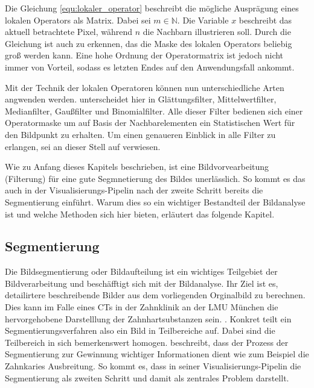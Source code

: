 Die Gleichung \ref{equ:lokaler_operator} beschreibt die mögliche Ausprägung eines
lokalen Operators als Matrix. Dabei sei $m \in \mathbb{N}$. Die Variable $x$ beschreibt
das aktuell betrachtete Pixel, während $n$ die Nachbarn illustrieren soll. Durch
die Gleichung ist auch zu erkennen, das die Maske des lokalen Operators beliebig
groß werden kann. Eine hohe Ordnung der Operatormatrix ist jedoch nicht immer von
Vorteil, sodass es letzten Endes auf den Anwendungsfall ankommt.

Mit der Technik der lokalen Operatoren können nun unterschiedliche Arten
angwenden werden. \citet[Seite 54 - 55]{handels2000} unterscheidet hier in Glättungsfilter,
Mittelwertfilter, Medianfilter, Gaußfilter und Binomialfilter. Alle dieser Filter
bedienen sich einer Operatormaske um auf Basis der Nachbarelementen ein Statistischen
Wert für den Bildpunkt zu erhalten. Um einen genaueren Einblick in alle Filter
zu erlangen, sei an dieser Stell auf \citet[Seite 54 - 55]{handels2000} verwiesen.

Wie zu Anfang dieses Kapitels beschrieben, ist eine Bildvorvearbeitung (Filterung)
für eine gute Segmnetierung des Bildes unerlässlich. So kommt es das auch in der
Visualisierungs-Pipelin nach \citet[Seite 50]{handels2000} der zweite Schritt bereits
die Segmentierung einführt. Warum dies so ein wichtiger Bestandteil der
Bildanalyse ist und welche Methoden sich hier bieten, erläutert das folgende Kapitel.

\subsection{Segmentierung}
\label{subsec:segmentierung} Die Bildsegmentierung oder Bildaufteilung ist ein wichtiges
Teilgebiet der Bildverarbeitung und beschäfftigt sich mit der Bildanalyse. Ihr
Ziel ist es, detailirtere beschreibende Bilder aus dem vorliegenden Orginalbild zu
berechnen. Dies kann im Falle eines CTs in der Zahnklinik an der LMU München die
hervorgehobene Darstelllung der Zahnhartsubstanzen sein. \citep[vgl.][Seite 359]{lehmann2013bildverarbeitung}.
Konkret teilt ein Segmentierungsverfahren also ein Bild in Teilbereiche auf. Dabei
sind die Teilbereich in sich bemerkenswert homogen. \citet[Seite 1]{ramesh2021}
beschreibt, dass der Prozess der Segmentierung zur Gewinnung wichtiger Informationen
dient wie zum Beispiel die Zahnkaries Ausbreitung. So kommt es, dass \citet[Seite
50]{handels2000} in seiner Visualisierungs-Pipelin die Segmentierung als zweiten
Schritt und damit als zentrales Problem darstellt.

